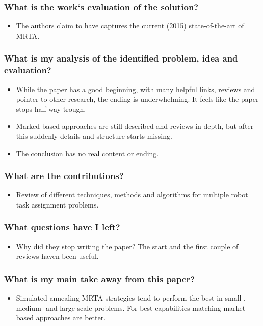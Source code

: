     \subsubsection*{What is the work`s evaluation of the solution?}
    \begin{itemize}
        \item The authors claim to have captures the current (2015) state-of-the-art of MRTA.
    \end{itemize}
    \subsubsection*{What is my analysis of the identified problem, idea and evaluation?}
    \begin{itemize}
        \item While the paper has a good beginning, with many helpful links, reviews and pointer to other research, the ending is underwhelming. It feels like the paper stops half-way trough. 
        \item Marked-based approaches are still described and reviews in-depth, but after this suddenly details and structure starts missing.
        \item The conclusion has no real content or ending.
    \end{itemize}
    \subsubsection*{What are the contributions?}
    \begin{itemize}
        \item Review of different techniques, methods and algorithms for multiple robot task assignment problems.
    \end{itemize}
    \subsubsection*{What questions have I left?}
    \begin{itemize}
        \item Why did they stop writing the paper? The start and the first couple of reviews haven been useful.
    \end{itemize}
    \subsubsection*{What is my main take away from this paper?}
    \begin{itemize}
        \item Simulated annealing MRTA strategies tend to perform the best in small-, medium- and large-scale problems. For best capabilities matching market-based approaches are better.
    \end{itemize}
    
